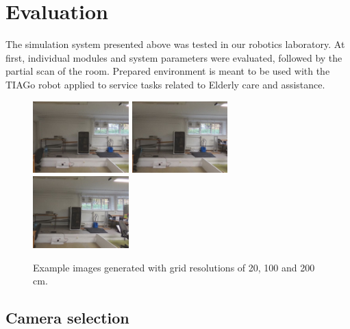\documentclass[conference]{ieeetran}
\begin{document}
\section{Evaluation}
\label{sec:evaluation}

The simulation system presented above was tested in our robotics laboratory. At first, individual modules
and system parameters were evaluated, followed by the partial scan of the room. Prepared environment is 
meant to be used with the TIAGo robot applied to service tasks related to Elderly care and assistance.

\begin{figure}[!ht]
    \centering
    \includegraphics[width=0.33\textwidth]{img/grid_sizes/10}\hfill%
    \includegraphics[width=0.33\textwidth]{img/grid_sizes/50}\hfill%
    \includegraphics[width=0.33\textwidth]{img/grid_sizes/100}\\
    \caption{Example images generated with grid resolutions of 20, 100 and 200 cm.}
    \label{fig:grid_sizes}
\end{figure}

\subsection{Camera selection}
\end{document}
